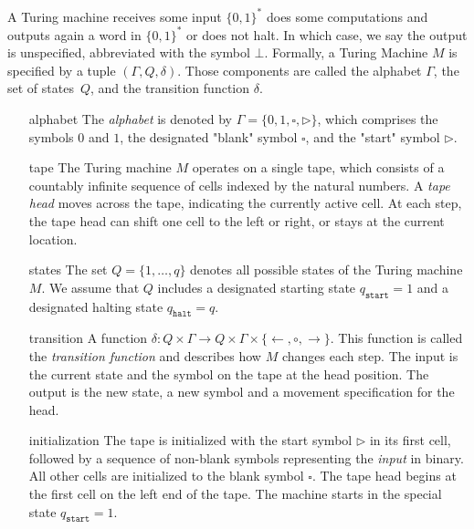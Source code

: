 \documentclass{article}
\begin{document}
\begin{definition}
A Turing machine receives some input $\{0,1\}^*$ does some computations and outputs again a word in $\{0,1\}^*$
or does not halt. In which case, we say the output is unspecified, abbreviated with the symbol $\bot$.
Formally, a Turing Machine $M$ is specified by a tuple $(\Gamma, Q, \delta)$.
Those components are called the alphabet $\Gamma$, the set of states~$Q$, and the transition function $\delta$.
\begin{itemize}[leftmargin=2cm]
     \item[alphabet] 
    The \textit{alphabet} is denoted by $\Gamma = \{0, 1, \square, \rhd\}$, which comprises the symbols $0$ and $1$, the designated "blank" symbol $\square$, and the "start" symbol $\rhd$. 
    \item[tape]
    The Turing machine $M$ operates on a single tape, which consists of a countably infinite sequence of cells indexed by the natural numbers. A \textit{tape head} moves across the tape, indicating the currently active cell. At each step, the tape head can shift one cell to the left or right, or stays at the current location.

    \item[states]
    The set $Q = \{1,\ldots,q\}$ denotes all possible states of the Turing machine $M$. 
    We assume that $Q$ includes a designated starting state $q_{\texttt{start}} = 1$ and a designated halting state $q_{\texttt{halt}} = q$.
    \item[transition] A function $\delta: Q \times \Gamma \rightarrow Q \times \Gamma \times \{ \leftarrow, \circ, \rightarrow \}$.
    This function is called the \textit{transition function} and describes how $M$ changes each step.
    The input is the current state and the symbol on the tape at the head position.
    The output is the new state, a new symbol and a movement specification for the head.
    \item[initialization] 
    The tape is initialized with the start symbol $\rhd$ in its first cell, followed by a sequence of non-blank symbols representing the \textit{input} in binary. All other cells are initialized to the blank symbol $\square$. The tape head begins at the first cell on the left end of the tape. The machine starts in the special state $q_{\texttt{start}}=1$.


\end{itemize}
\end{definition}
\end{document}
